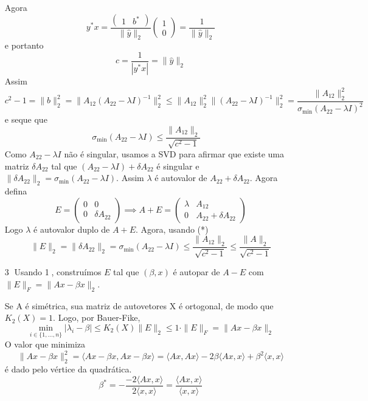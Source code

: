 \documentclass[a4paper,12pt]{article}
\begin{document}
\begin{enumerate}

Agora $$y^*x = \frac{\begin{pmatrix} 1 & b^* \end{pmatrix}}{\|\hat{y}\|_2} \begin{pmatrix} 1 \\ 0 \end{pmatrix} = \frac1{\|\hat{y}\|_2} $$ e portanto $$c = \frac{1}{|y^*x|} = {\|\hat{y}\|_2}$$
 Assim
\[ c^2 - 1 = \|b\|_2^2 = \|A_{12}(A_{22} - \lambda I)^{-1}\|_2^2 \le \|A_{12}\|_2^2 \|(A_{22} - \lambda I)^{-1}\|_2^2 = \frac{\|A_{12}\|_2^2}{\sigma_{\min}(A_{22}-\lambda I)^2} \]
e seque que 
\[ \sigma_{\min}(A_{22}-\lambda I) \le \frac{\|A_{12}\|_2}{\sqrt{c^2-1}} \quad \tag{*}\]
Como $A_{22}-\lambda I$ não é singular, usamos a SVD para afirmar que existe uma matriz $\delta A_{22}$ tal que $(A_{22}-\lambda I) + \delta A_{22}$ é singular e $\|\delta A_{22}\|_2 = \sigma_{\min}(A_{22}-\lambda I)$.
Assim $\lambda$ é autovalor de $A_{22} + \delta A_{22}$.
Agora defina
\[ E = \begin{pmatrix} 0 & 0 \\ 0 & \delta A_{22} \end{pmatrix} \implies A+E = \begin{pmatrix} \lambda & A_{12} \\ 0 & A_{22} + \delta A_{22} \end{pmatrix} \]
Logo $\lambda$ é autovalor duplo de $A+E$. Agora, usando (*)
\[ \|E\|_2 = \|\delta A_{22}\|_2 = \sigma_{\min}(A_{22}-\lambda I) \le \frac{\|A_{12}\|_2}{\sqrt{c^2-1}} \le \frac{\|A\|_2}{\sqrt{c^2-1}} \]
 
    \item[\textcircled{3}] %
    Usando \textcircled{1}, construímos $E$ tal que $(\beta, x)$ é autopar de $A-E$ com $\|E\|_F = \|Ax - \beta x\|_2$.

    Se A é simétrica, sua matriz de autovetores X é ortogonal, de modo que $K_2(X) = 1$. Logo, por Bauer-Fike,
    \[
    \min_{i \in \{1, \dots, n\}} |\lambda_i - \beta| \le K_2(X)\|E\|_2 \le 1 \cdot \|E\|_F = \|Ax - \beta x\|_2
    \]
    O valor que minimiza $$\|Ax - \beta x\|_2^2 = \langle Ax - \beta x, Ax - \beta x \rangle = \langle Ax, Ax \rangle - 2\beta \langle Ax, x \rangle + \beta^2 \langle x, x \rangle$$ é dado pelo vértice da quadrática.
    \[
    \beta^* = -\frac{-2\langle Ax, x \rangle}{2\langle x, x \rangle} = \frac{\langle Ax, x \rangle}{\langle x, x \rangle}
    \]
\end{enumerate}
\end{document}

